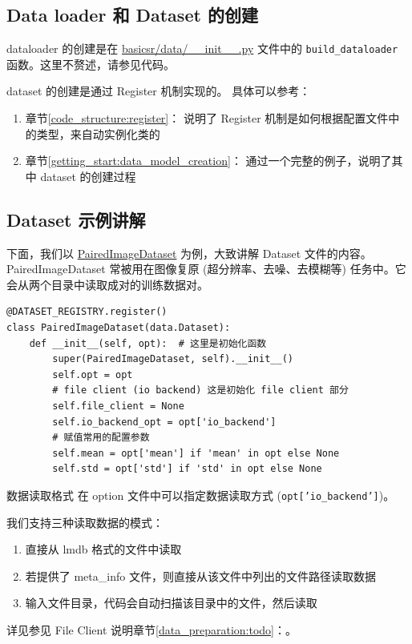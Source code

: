 \documentclass[../main.tex]{subfiles}
\begin{document}
\subsection{Data loader 和 Dataset 的创建}\label{code_structure:dataloader_dataset}

dataloader 的创建是在 \href{https://github.com/XPixelGroup/BasicSR/blob/master/basicsr/data/\_\_init\_\_.py}{basicsr/data/\_\_init\_\_.py} 文件中的 \texttt{build\_dataloader} 函数。这里不赘述，请参见代码。

dataset 的创建是通过 Register 机制实现的。
具体可以参考：
\begin{enumerate}
    \item 章节\ref{code_structure:register}： 说明了 Register 机制是如何根据配置文件中的类型，来自动实例化类的
    \item 章节\ref{getting_start:data_model_creation}： 通过一个完整的例子，说明了其中 dataset 的创建过程
\end{enumerate}

\subsection{Dataset 示例讲解}\label{code_structure:dataset_example}

下面，我们以 \href{https://github.com/XPixelGroup/BasicSR/blob/master/basicsr/data/paired\_image\_dataset.py}{PairedImageDataset} 为例，大致讲解 Dataset 文件的内容。
PairedImageDataset 常被用在图像复原 (超分辨率、去噪、去模糊等) 任务中。它会从两个目录中读取成对的训练数据对。

\begin{verbatim}
@DATASET_REGISTRY.register()
class PairedImageDataset(data.Dataset):
    def __init__(self, opt):  # 这里是初始化函数
        super(PairedImageDataset, self).__init__()
        self.opt = opt
        # file client (io backend) 这是初始化 file client 部分
        self.file_client = None
        self.io_backend_opt = opt['io_backend']
        # 赋值常用的配置参数
        self.mean = opt['mean'] if 'mean' in opt else None
        self.std = opt['std'] if 'std' in opt else None
\end{verbatim}
\begin{exampleBox}[righthand ratio=0.00, sidebyside, sidebyside align=center, lower separated=false]{数据读取格式}
    在 option 文件中可以指定数据读取方式 (\texttt{opt['io\_backend']})。

    我们支持三种读取数据的模式：
    \begin{enumerate}
        \item 直接从 lmdb 格式的文件中读取
        \item 若提供了 meta\_info 文件，则直接从该文件中列出的文件路径读取数据
        \item 输入文件目录，代码会自动扫描该目录中的文件，然后读取
    \end{enumerate}
    详见参见 File Client 说明章节\ref{data_preparation:todo}：。 
\end{exampleBox}
\end{document}
